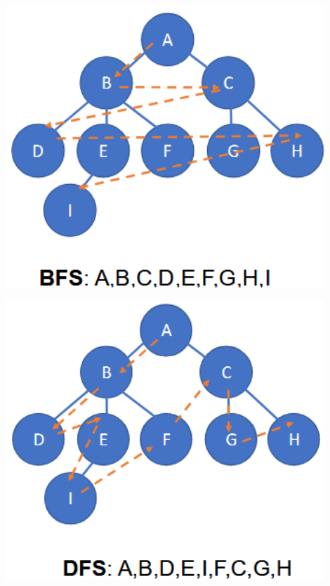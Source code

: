 \documentclass[
../../EiKI_Summary.tex,
]
{subfiles}
\begin{document}
\begin{minipage}
    [t]{0.45\textwidth}
    \centering
    \includegraphics[width=0.9\textwidth]{Pics/03/BFSTraversal.png}
\end{minipage}
\hfill
\begin{minipage}
    [t]{0.45\textwidth}
    \centering
    \includegraphics[width=0.9\textwidth]{Pics/03/DFSTraversal.png}
\end{minipage}
\end{document}
